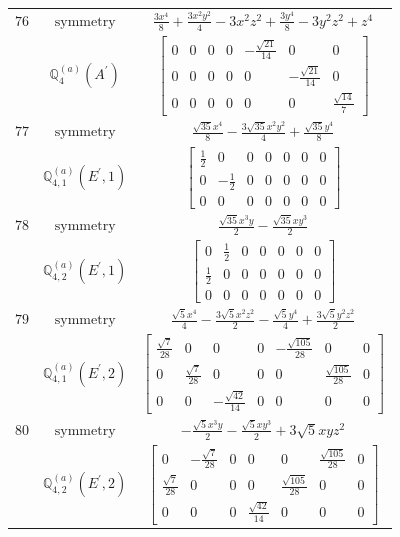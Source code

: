 \documentclass[fleqn,8pt,landscape]{jsarticle}
\begin{document}
\begin{longtable}{ccc}
$ 76 $ & $ \text{symmetry} $ & $ \frac{3 x^{4}}{8} + \frac{3 x^{2} y^{2}}{4} - 3 x^{2} z^{2} + \frac{3 y^{4}}{8} - 3 y^{2} z^{2} + z^{4} $ \\
$  $ & $ \mathbb{Q}_{4}^{(a)}(A^{\prime}) $ & $ \begin{bmatrix} 0 & 0 & 0 & 0 & - \frac{\sqrt{21}}{14} & 0 & 0 \\ 0 & 0 & 0 & 0 & 0 & - \frac{\sqrt{21}}{14} & 0 \\ 0 & 0 & 0 & 0 & 0 & 0 & \frac{\sqrt{14}}{7} \end{bmatrix} $ \\ \hline
$ 77 $ & $ \text{symmetry} $ & $ \frac{\sqrt{35} x^{4}}{8} - \frac{3 \sqrt{35} x^{2} y^{2}}{4} + \frac{\sqrt{35} y^{4}}{8} $ \\
$  $ & $ \mathbb{Q}_{4,1}^{(a)}(E^{\prime},1) $ & $ \begin{bmatrix} \frac{1}{2} & 0 & 0 & 0 & 0 & 0 & 0 \\ 0 & - \frac{1}{2} & 0 & 0 & 0 & 0 & 0 \\ 0 & 0 & 0 & 0 & 0 & 0 & 0 \end{bmatrix} $ \\ \hline
$ 78 $ & $ \text{symmetry} $ & $ \frac{\sqrt{35} x^{3} y}{2} - \frac{\sqrt{35} x y^{3}}{2} $ \\
$  $ & $ \mathbb{Q}_{4,2}^{(a)}(E^{\prime},1) $ & $ \begin{bmatrix} 0 & \frac{1}{2} & 0 & 0 & 0 & 0 & 0 \\ \frac{1}{2} & 0 & 0 & 0 & 0 & 0 & 0 \\ 0 & 0 & 0 & 0 & 0 & 0 & 0 \end{bmatrix} $ \\ \hline
$ 79 $ & $ \text{symmetry} $ & $ \frac{\sqrt{5} x^{4}}{4} - \frac{3 \sqrt{5} x^{2} z^{2}}{2} - \frac{\sqrt{5} y^{4}}{4} + \frac{3 \sqrt{5} y^{2} z^{2}}{2} $ \\
$  $ & $ \mathbb{Q}_{4,1}^{(a)}(E^{\prime},2) $ & $ \begin{bmatrix} \frac{\sqrt{7}}{28} & 0 & 0 & 0 & - \frac{\sqrt{105}}{28} & 0 & 0 \\ 0 & \frac{\sqrt{7}}{28} & 0 & 0 & 0 & \frac{\sqrt{105}}{28} & 0 \\ 0 & 0 & - \frac{\sqrt{42}}{14} & 0 & 0 & 0 & 0 \end{bmatrix} $ \\ \hline
$ 80 $ & $ \text{symmetry} $ & $ - \frac{\sqrt{5} x^{3} y}{2} - \frac{\sqrt{5} x y^{3}}{2} + 3 \sqrt{5} x y z^{2} $ \\
$  $ & $ \mathbb{Q}_{4,2}^{(a)}(E^{\prime},2) $ & $ \begin{bmatrix} 0 & - \frac{\sqrt{7}}{28} & 0 & 0 & 0 & \frac{\sqrt{105}}{28} & 0 \\ \frac{\sqrt{7}}{28} & 0 & 0 & 0 & \frac{\sqrt{105}}{28} & 0 & 0 \\ 0 & 0 & 0 & \frac{\sqrt{42}}{14} & 0 & 0 & 0 \end{bmatrix} $ \\ \hline

\end{longtable}
\end{document}
